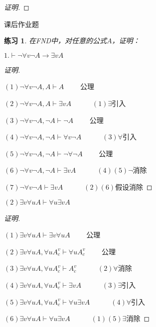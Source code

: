 \documentclass{article}
\newtheorem{Exercise}{练习}
\begin{document}
\begin{CJK*}{UTF8}{gbsn}
\begin{proof}[证明]
  \end{proof}

  课后作业题

  \begin{Exercise}
    在FND中，对任意的公式$A$，证明：
  \end{Exercise}

$1.\vdash \lnot \forall v\lnot A\to \exists vA$
\begin{proof}[证明]$\quad$

$(1)\lnot \forall v\lnot A, A \vdash A\quad\quad$ 公理

$(2)\lnot \forall v\lnot A, A \vdash \exists v A \quad\quad\quad(1)\exists $引入 

$(3)\lnot \forall v\lnot A, \lnot A \vdash \lnot A \quad\quad$ 公理

$(4)\lnot \forall v\lnot A, \lnot A \vdash \forall v \lnot A \quad\quad\quad(3)\forall$引入

$(5)\lnot \forall v\lnot A, \lnot A \vdash \lnot \forall \lnot A\quad\quad$ 公理

$(6)\lnot \forall v\lnot A, \lnot A \vdash \exists v A \quad\quad\quad(4)(5)\lnot$消除 

$(7)\lnot \forall v\lnot A \vdash \exists v A\quad\quad\quad(2)(6)$假设消除
\end{proof}

$(2)\exists v\forall u A\vdash \forall u\exists v A$
 \begin{proof}[证明]$\quad$

  $(1)\exists v\forall u A\vdash \exists v\forall u A\quad\quad$ 公理

  $(2)\exists v\forall u A, \forall u A^v_c   \vdash \forall u A^v_c\quad\quad$ 公理

  $(3)\exists v\forall u A, \forall u A^v_c   \vdash  A^v_c \quad\quad\quad(2)\forall$消除

  $(4)\exists v\forall u A, \forall u A^v_c   \vdash  \exists v A\quad\quad\quad(3)\exists$引入

  $(5)\exists v\forall u A, \forall u A^v_c   \vdash  \forall u\exists v A\quad\quad\quad(4)\forall$引入

  $(6)\exists v\forall u A  \vdash  \forall u\exists v A\quad\quad\quad(1)(5)\exists$消除
\end{proof} 
\end{CJK*}
\end{document}
